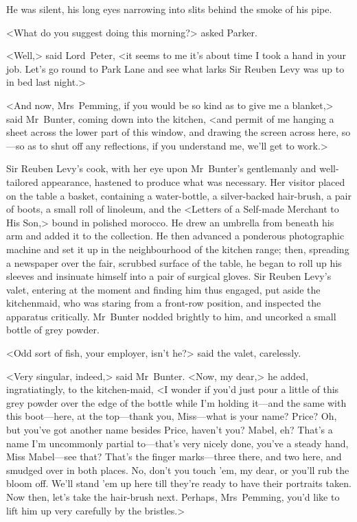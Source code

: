 He was silent, his long eyes narrowing into slits behind the smoke of his pipe.

<What do you suggest doing this morning?> asked Parker.

<Well,> said Lord~Peter, <it seems to me it's about time I took a hand in your job. Let's go round to Park Lane and see what larks Sir Reuben Levy was up to in bed last night.>

<And now, Mrs~Pemming, if you would be so kind as to give me a blanket,> said Mr~Bunter, coming down into the kitchen, <and permit of me hanging a sheet across the lower part of this window, and drawing the screen across here, so—so as to shut off any reflections, if you understand me, we'll get to work.>

Sir Reuben Levy's cook, with her eye upon Mr~Bunter's gentlemanly and well-tailored appearance, hastened to produce what was necessary. Her visitor placed on the table a basket, containing a water-bottle, a silver-backed hair-brush, a pair of boots, a small roll of linoleum, and the <Letters of a Self-made Merchant to His Son,> bound in polished morocco. He drew an umbrella from beneath his arm and added it to the collection. He then advanced a ponderous photographic machine and set it up in the neighbourhood of the kitchen range; then, spreading a newspaper over the fair, scrubbed surface of the table, he began to roll up his sleeves and insinuate himself into a pair of surgical gloves. Sir Reuben Levy's valet, entering at the moment and finding him thus engaged, put aside the kitchenmaid, who was staring from a front-row position, and inspected the apparatus critically. Mr~Bunter nodded brightly to him, and uncorked a small bottle of grey powder.

<Odd sort of fish, your employer, isn't he?> said the valet, carelessly.

<Very singular, indeed,> said Mr~Bunter. <Now, my dear,> he added, ingratiatingly, to the kitchen-maid, <I wonder if you'd just pour a little of this grey powder over the edge of the bottle while I'm holding it—and the same with this boot—here, at the top—thank you, Miss—what is your name? Price? Oh, but you've got another name besides Price, haven't you? Mabel, eh? That's a name I'm uncommonly partial to—that's very nicely done, you've a steady hand, Miss Mabel—see that? That's the finger marks—three there, and two here, and smudged over in both places. No, don't you touch 'em, my dear, or you'll rub the bloom off. We'll stand 'em up here till they're ready to have their portraits taken. Now then, let's take the hair-brush next. Perhaps, Mrs~Pemming, you'd like to lift him up very carefully by the bristles.>

